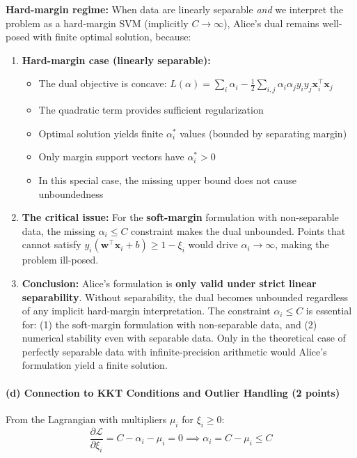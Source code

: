 \documentclass[12pt,a4paper]{article}
\theoremstyle{definition}
\begin{document}
\textbf{Hard-margin regime:} When data are linearly separable \textit{and} we interpret the problem as a hard-margin SVM (implicitly $C \to \infty$), Alice's dual remains well-posed with finite optimal solution, because:

\begin{enumerate}
\item \textbf{Hard-margin case (linearly separable):}
   \begin{itemize}
   \item The dual objective is concave: $L(\alpha) = \sum_{i} \alpha_i - \frac{1}{2}\sum_{i,j} \alpha_i\alpha_j y_i y_j \mathbf{x}_i^\top \mathbf{x}_j$
   \item The quadratic term provides sufficient regularization
   \item Optimal solution yields finite $\alpha_i^*$ values (bounded by separating margin)
   \item Only margin support vectors have $\alpha_i^* > 0$
   \item In this special case, the missing upper bound does not cause unboundedness
   \end{itemize}

\item \textbf{The critical issue:} For the \textbf{soft-margin} formulation with non-separable data, the missing $\alpha_i \leq C$ constraint makes the dual unbounded. Points that cannot satisfy $y_i(\mathbf{w}^\top \mathbf{x}_i + b) \geq 1 - \xi_i$ would drive $\alpha_i \to \infty$, making the problem ill-posed.

\item \textbf{Conclusion:} Alice's formulation is \textbf{only valid under strict linear separability}. Without separability, the dual becomes unbounded regardless of any implicit hard-margin interpretation. The constraint $\alpha_i \leq C$ is essential for: (1) the soft-margin formulation with non-separable data, and (2) numerical stability even with separable data. Only in the theoretical case of perfectly separable data with infinite-precision arithmetic would Alice's formulation yield a finite solution.
\end{enumerate}

\paragraph{(d) Connection to KKT Conditions and Outlier Handling (2 points)}

From the Lagrangian with multipliers $\mu_i$ for $\xi_i \geq 0$:
\begin{equation}
\frac{\partial \mathcal{L}}{\partial \xi_i} = C - \alpha_i - \mu_i = 0 \implies \alpha_i = C - \mu_i \leq C
\end{equation}
\end{document}

